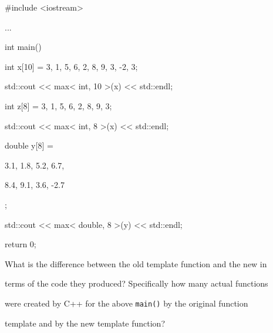 \begin{consolethree}[escapeinside=||]

#include <iostream>



...



int main()

{

    int x[10] = {3, 1, 5, 6, 2, 8, 9, 3, -2, 3};

    std::cout << max< int, 10 >(x) << std::endl;



    int z[8] = {3, 1, 5, 6, 2, 8, 9, 3};

    std::cout << max< int, 8 >(x) << std::endl;



    double y[8] = {3.1, 1.8, 5.2, 6.7,

                   8.4, 9.1, 3.6, -2.7};

    std::cout << max< double, 8 >(y) << std::endl;

    return 0;

}

\end{consolethree}



What is the difference between the old template function and the new in

terms of the code they produced? Specifically how many actual functions

were created by C++ for the above \texttt{main()} by the original function

template and by the new template function?

